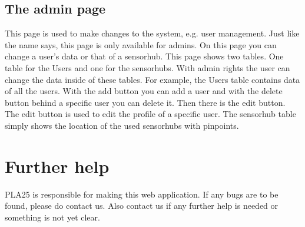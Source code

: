 \documentclass[a4paper]{article}
\begin{document}
\pagebreak

\subsection{The admin page}
This page is used to make changes to the system, e.g. user management. Just like the name says, this page is only available for admins. On this page you can change a user's data or that of a sensorhub.
\newline
This page shows two tables. One table for the Users and one for the sensorhubs. With admin rights the user can change the data inside of these tables.
\newline
For example, the Users table contains data of all the users. With the add button you can add a user and with the delete button behind a specific user you can delete it. Then there is the edit button. The edit button is used to edit the profile of a specific user.
\newline
The sensorhub table simply shows the location of the used sensorhubs with pinpoints.

\pagebreak

\section{Further help}
PLA25 is responsible for making this web application. If any bugs are to be found, please do contact us.
Also contact us if any further help is needed or something is not yet clear.
\end{document}
